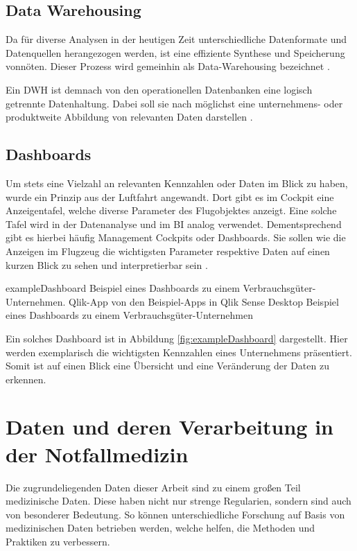 \subsection{Data Warehousing}
\label{sub:warehouse}
Da für diverse Analysen in der heutigen Zeit unterschiedliche Datenformate und Datenquellen herangezogen werden, ist eine effiziente Synthese und Speicherung vonnöten.
Dieser Prozess wird gemeinhin als \glqq Data-Warehousing\grqq{} bezeichnet \cite[S.7]{Gabriel.2011}.

Ein \gls{DWH} ist demnach von den operationellen Datenbanken eine logisch getrennte Datenhaltung.
Dabei soll sie nach \cite[S.6]{Mucksch.2000} möglichst eine unternehmens- oder produktweite Abbildung von relevanten Daten darstellen \cite{Kemper.2004}.




\subsection{Dashboards}
\label{sub:dashboards}
Um stets eine Vielzahl an relevanten Kennzahlen oder Daten im Blick zu haben, wurde ein Prinzip aus der Luftfahrt angewandt.
Dort gibt es im Cockpit eine Anzeigentafel, welche diverse Parameter des Flugobjektes anzeigt.
Eine solche Tafel wird in der Datenanalyse und im \gls{BI} analog verwendet.
Dementsprechend gibt es hierbei häufig \glqq Management Cockpits\grqq{} oder \glqq Dashboards\grqq.
Sie sollen wie die Anzeigen im Flugzeug die wichtigsten Parameter respektive Daten auf einen kurzen Blick zu sehen und interpretierbar sein \cite[S.18]{Engels.2015}.

\bildbreit
{exampleDashboard}
{Beispiel eines Dashboards zu einem Verbrauchsgüter-Unternehmen. Qlik-App von den Beispiel-Apps in Qlik Sense Desktop}
{Beispiel eines Dashboards zu einem Verbrauchsgüter-Unternehmen}

Ein solches Dashboard ist in Abbildung \ref{fig:exampleDashboard} dargestellt.
Hier werden exemplarisch die wichtigsten Kennzahlen eines Unternehmens präsentiert.
Somit ist auf einen Blick eine Übersicht und eine Veränderung der Daten zu erkennen.


\section{Daten und deren Verarbeitung in der Notfallmedizin} %
Die zugrundeliegenden Daten dieser Arbeit sind zu einem großen Teil medizinische Daten.
Diese haben nicht nur strenge Regularien, sondern sind auch von besonderer Bedeutung.
So können unterschiedliche Forschung auf Basis von medizinischen Daten betrieben werden, welche helfen, die Methoden und Praktiken zu verbessern.

